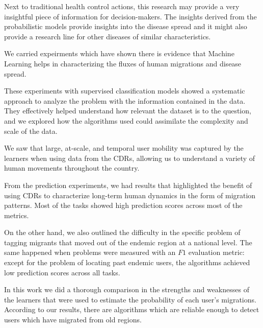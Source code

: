Next to traditional health control actions, this research may provide a very insightful piece of information for decision-makers.
The insights derived from the probabilistic models provide insights into the disease spread and it might also provide a research line for  other diseases of similar characteristics.

We carried expeirments which have shown there is evidence that Machine Learning helps in characterizing the fluxes of human migrations and disease spread.


These experiments with supervised classification models showed a systematic approach to analyze the problem with the information contained in the data.
They effectively helped understand how relevant the dataset is to the question, and we explored how the algorithms used could assimilate the complexity and scale of the data.

We saw that large, at-scale, and temporal user mobility was captured by the learners when using data from the CDRs, allowing us to understand a variety of human movements throughout the country.


From the prediction experiments, we had results that highlighted the benefit of using CDRs to characterize long-term human dynamics in the form of migration patterns.
Most of the tasks showed high prediction scores across most of the metrics.

On the other hand, we also outlined the difficulty in the specific problem of tagging migrants that moved out of the endemic region at a national level.
The same happened when problems were measured with an $F1$ evaluation metric: except for the problem of locating past endemic users, the algorithms achieved low prediction scores across all tasks.


In this work we did a thorough comparison in the strengths and weaknesses of the learners that were used to estimate the probability of each user's migrations.
According to our results, there are algorithms which are reliable enough to detect users which have migrated from old regions.

